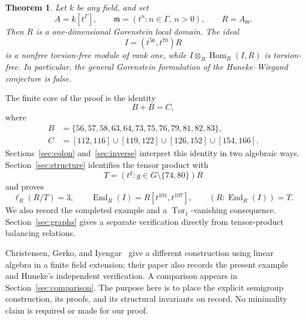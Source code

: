 \documentclass[11pt,letterpaper]{article}
\newtheorem{theorem}{Theorem}[section]
\theoremstyle{remark}
\newcommand{\m}{\mathfrak m}
\newcommand{\End}{\operatorname{End}}
\newcommand{\Hom}{\operatorname{Hom}}
\newcommand{\Tor}{\operatorname{Tor}}
\newcommand{\length}{\ell}
\numberwithin{equation}{section}
\begin{document}
\begin{theorem}\label{thm:main}
Let $k$ be any field, and set
\[
 A=k[t^\Gamma],\qquad \m=(t^n:n\in\Gamma,\ n>0),\qquad R=A_{\m}.
\]
Then $R$ is a one-dimensional Gorenstein local domain. The ideal
\[
 I=(t^{56},t^{70})R
\]
is a nonfree torsion-free module of rank one, while $I\otimes_R\Hom_R(I,R)$ is torsion-free. In particular, the general Gorenstein formulation of the Huneke--Wiegand conjecture is false.
\end{theorem}

The finite core of the proof is the identity
\begin{equation}\label{eq:core}
 B+B=C,
\end{equation}
where
\begin{equation}\label{eq:BC}
\begin{split}
 B&=\{56,57,58,63,64,73,75,76,79,81,82,83\},\\
 C&=[112,116]\cup[119,122]\cup[126,152]\cup[154,166].
\end{split}
\end{equation}
Sections~\ref{sec:colon} and~\ref{sec:inverse} interpret this identity in two algebraic ways. Section~\ref{sec:structure} identifies the tensor product with
\[
 T=(t^g:g\in G\setminus\{74,80\})R
\]
and proves
\[
 \length_R(R/T)=3,\qquad
 \End_R(I)=R[t^{101},t^{107}],\qquad
 (R:\End_R(I))=T.
\]
We also record the completed example and a $\Tor_1$-vanishing consequence. Section~\ref{sec:graphs} gives a separate verification directly from tensor-product balancing relations.

Christensen, Gerko, and Iyengar~\cite{CGI} give a different construction using linear algebra in a finite field extension; their paper also records the present example and Huneke's independent verification. A comparison appears in Section~\ref{sec:comparison}. The purpose here is to place the explicit semigroup construction, its proofs, and its structural invariants on record. No minimality claim is required or made for our proof.
\end{document}
